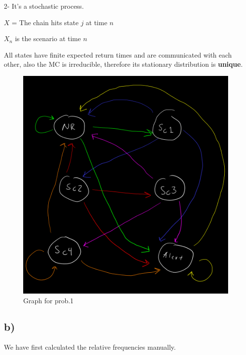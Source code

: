 \documentclass[]{article}
\begin{document}
2- It's a stochastic process.

\(X\) = The chain hits state \(j\) at time \(n\)

\(X_{n}\) is the scenario at time \(n\)

All states have finite expected return times and are communicated with
each other, also the MC is irreducible, therefore its stationary
distribution is \textbf{unique}.

\begin{figure}
\centering
\includegraphics{./grafo1.png}
\caption{Graph for prob.1}
\end{figure}

\newpage

\hypertarget{b}{%
\subsection{b)}\label{b}}

We have first calculated the relative frequencies manually.
\end{document}
